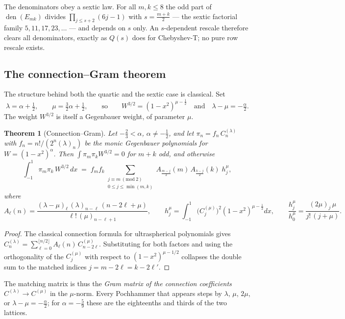 \documentclass[11pt,a4paper]{article}
\newtheorem{theorem}{Theorem}[section]
\begin{document}
The denominators obey a sextic law.  For all $m,k\le8$ the odd part of
$\operatorname{den}(E_{mk})$ divides $\prod_{j\le s+2}(6j-1)$ with
$s=\tfrac{m+k}2$ --- the sextic factorial family $5,11,17,23,\ldots$ ---
and depends on $s$ only.  An $s$-dependent rescale therefore clears all
denominators, exactly as $Q(s)$ does for Chebyshev-T; no pure row rescale
exists.

\subsection{The connection--Gram theorem}

The structure behind both the quartic and the sextic case is classical.
Set
\[
  \lambda=\alpha+\tfrac12,\qquad \mu=\tfrac32\alpha+\tfrac12,
  \qquad\text{so}\qquad W^{3/2}=(1-x^2)^{\mu-\frac12}
  \quad\text{and}\quad \lambda-\mu=-\tfrac{\alpha}{2}.
\]
The weight $W^{3/2}$ is itself a Gegenbauer weight, of parameter $\mu$.

\begin{theorem}[Connection--Gram]\label{thm:conn-gram}
  Let $-\tfrac23<\alpha$, $\alpha\ne-\tfrac12$, and let
  $\pi_n=f_n\,C_n^{(\lambda)}$ with $f_n=n!/(2^n(\lambda)_n)$ be the monic
  Gegenbauer polynomials for $W=(1-x^2)^\alpha$.  Then
  $\int\pi_m\pi_k W^{3/2}=0$ for $m+k$ odd, and otherwise
  \[
    \int_{-1}^1 \pi_m\pi_k\,W^{3/2}\,dx
    \;=\; f_m f_k \!\!\sum_{\substack{j\equiv m\ (\mathrm{mod}\ 2)\\
      0\le j\le\min(m,k)}}\!\!
      A_{\frac{m-j}{2}}(m)\,A_{\frac{k-j}{2}}(k)\;h_j^{\mu},
  \]
  where
  \[
    A_\ell(n)=\frac{(\lambda-\mu)_\ell\,(\lambda)_{n-\ell}\,(n-2\ell+\mu)}
                   {\ell!\,(\mu)_{n-\ell+1}},
    \qquad
    h_j^{\mu}=\int_{-1}^1\!\bigl(C_j^{(\mu)}\bigr)^2(1-x^2)^{\mu-\frac12}dx,
    \qquad
    \frac{h_j^{\mu}}{h_0^{\mu}}=\frac{(2\mu)_j\,\mu}{j!\,(j+\mu)}.
  \]
\end{theorem}

\begin{proof}
  The classical connection formula for ultraspherical polynomials
  \cite[\S18.18(iv)]{DLMF} gives
  $C_n^{(\lambda)}=\sum_{\ell=0}^{\lfloor n/2\rfloor}A_\ell(n)\,
  C_{n-2\ell}^{(\mu)}$.  Substituting for both factors and using the
  orthogonality of the $C_j^{(\mu)}$ with respect to $(1-x^2)^{\mu-1/2}$
  collapses the double sum to the matched indices $j=m-2\ell=k-2\ell'$.
\end{proof}

The matching matrix is thus the \emph{Gram matrix of the connection
coefficients} $C^{(\lambda)}\to C^{(\mu)}$ in the $\mu$-norm.  Every
Pochhammer that appears steps by $\lambda$, $\mu$, $2\mu$, or
$\lambda-\mu=-\tfrac\alpha2$; for $\alpha=-\tfrac59$ these are the
eighteenths and thirds of the two lattices.
\end{document}
